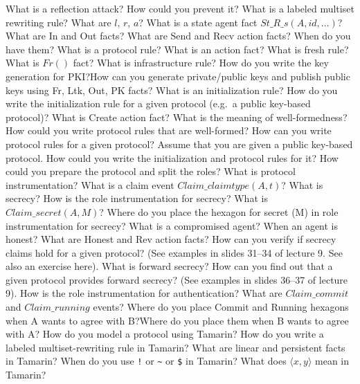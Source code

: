 \begin{questions}
\question{} What is a reflection attack? How could you prevent it?
\question{} What is a labeled multiset rewriting rule? What are $l$, $r$, $a$?
\question{} What is a state agent fact $St\_R\_s(A, id, \ldots)$?
\question{} What are In and Out facts? What are Send and Recv action facts? When do you have them?
\question{} What is a protocol rule? What is an action fact?
\question{} What is fresh rule? What is $Fr()$ fact?
\question{} What is infrastructure rule? How do you write the key generation for PKI?\@ How can you generate private/public keys and publish public keys using Fr, Ltk, Out, PK facts?
\question{} What is an initialization rule? How do you write the initialization rule for a given protocol (e.g.\ a public key-based protocol)? What is Create action fact?
\question{} What is the meaning of well-formedness? How could you write protocol rules that are well-formed?
\question{} How can you write protocol rules for a given protocol?
\question{} Assume that you are given a public key-based protocol. How could you write the initialization and protocol rules for it? How could you prepare the protocol and split the roles?
\question{} What is protocol instrumentation? What is a claim event $Claim\_claimtype(A,t)$?
\question{} What is secrecy?
\question{} How is the role instrumentation for secrecy? What is $Claim\_secret(A,M)$? Where do you place the hexagon for secret (M) in role instrumentation for secrecy?
\question{} What is a compromised agent? When an agent is honest? What are Honest and Rev action facts?
\question{} How can you verify if secrecy claims hold for a given protocol? (See examples in slides 31--34 of lecture 9. See also an exercise here).
\question{} What is forward secrecy?
\question{} How can you find out that a given protocol provides forward secrecy? (See examples in slides 36--37 of lecture 9).
\question{} How is the role instrumentation for authentication? What are $Claim\_commit$ and $Claim\_running$ events? Where do you place Commit and Running hexagons when A wants to agree with B?\@ Where do you place them when B wants to agree with A?\@
\question{} How do you model a protocol using Tamarin? How do you write a labeled multiset-rewriting rule in Tamarin?
\question{} What are linear and persistent facts in Tamarin? When do you use \texttt{!} or \texttt{\textasciitilde{}} or \texttt{\$} in Tamarin?
\question{} What does $\langle x, y \rangle$ mean in Tamarin?
\end{questions}
